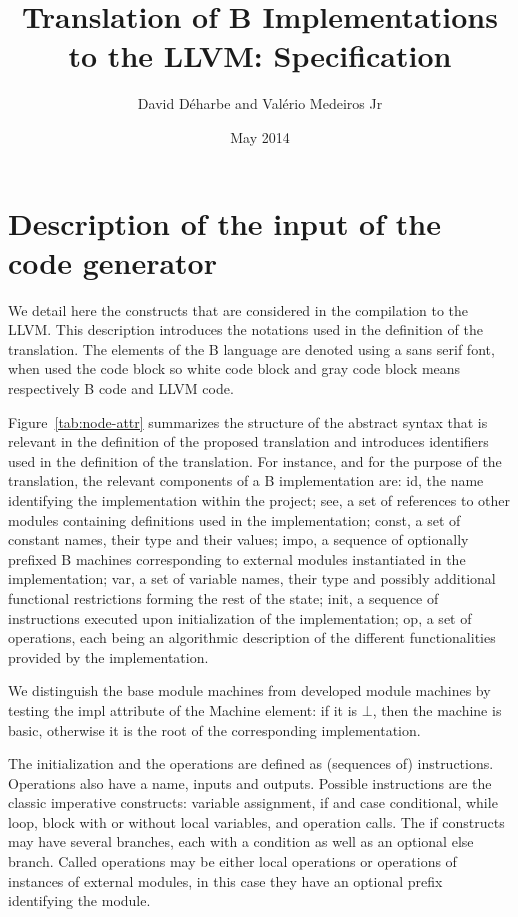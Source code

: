 \documentclass{llncs}
\title{Translation of B Implementations to the LLVM: Specification}
\author{David Déharbe and Valério Medeiros Jr}
\institute{Federal University of Rio Grande do Norte\\
Federal Institute of Education Science and Technology of Rio Grande do Norte\\
 Natal (Brazil)}
\date{May 2014}
\newcommand{\B}[1]{\textsf{#1}}
\begin{document}
\maketitle

\section{Description of the input of the code generator}
\label{sec:b-ast}

We detail here the constructs that are considered in the compilation to the
LLVM. This description introduces the notations used in the definition of the
translation. The elements of the B language are denoted using a \B{sans serif}
font, when used the code block so white code block and gray code block means
respectively B code and LLVM code.

Figure~\ref{tab:node-attr} summarizes the structure
of the abstract syntax that is relevant in the definition of the proposed
translation and introduces identifiers used in the definition of the
translation. For instance, and for the purpose of the translation, the relevant
components of a B implementation are: \B{id}, the name identifying the
implementation within the project; \B{see}, a set of references to other modules
containing definitions used in the implementation; \B{const}, a set of constant
names, their type and their values; \B{impo}, a sequence of optionally
prefixed B machines corresponding to external modules instantiated in the
implementation; \B{var}, a set of variable names, their type and possibly
additional functional restrictions forming the rest of the state; \B{init}, a
sequence of instructions executed upon initialization of the implementation;
\B{op}, a set of operations, each being an algorithmic description of the
different functionalities provided by the implementation.

We distinguish the base module machines from developed module machines by
testing the \B{impl} attribute of the \B{Machine} element: if it is $\bot$, then
the machine is basic, otherwise it is the root of the corresponding
implementation.

The initialization and the operations are defined as (sequences of)
instructions. Operations also have a name, inputs and outputs. Possible
instructions are the classic imperative constructs: variable assignment, if and
case conditional, while loop, block with or without local variables, and
operation calls. The if constructs may have several branches, each with a
condition as well as an optional else branch. Called operations may be either
local operations or operations of instances of external modules, in this case
they have an optional prefix identifying the module.
\end{document}
